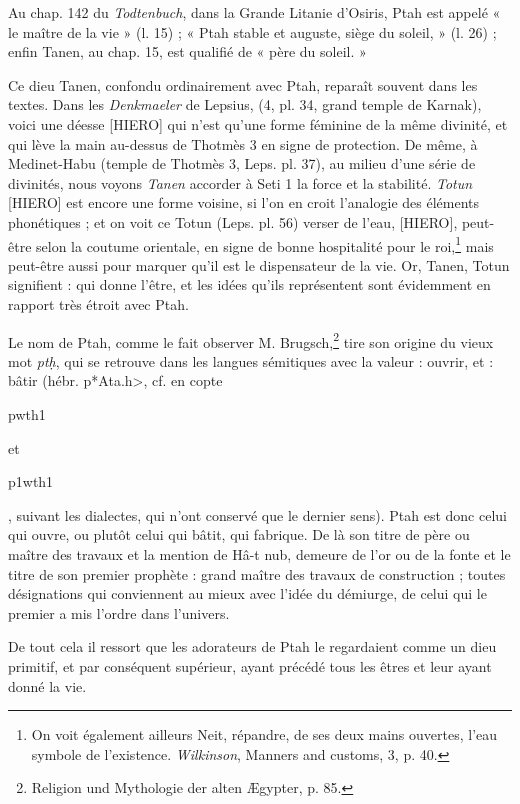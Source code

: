 \documentclass[a4paper, 11pt, oneside]{article}
\begin{document}
Au chap. 142 du \emph{Todtenbuch}, dans la Grande Litanie d'Osiris, Ptah est appelé « le maître de la vie » (l. 15) ; « Ptah stable et auguste, siège du soleil, » (l. 26) ; enfin Tanen, au chap. 15, est qualifié de « père du soleil. »

Ce dieu Tanen, confondu ordinairement avec Ptah, reparaît souvent dans les textes. Dans les \emph{Denkmaeler} de Lepsius, (4, pl. 34, grand temple de Karnak), voici une déesse [HIERO] qui n'est qu'une forme féminine de la même divinité, et qui lève la main au-dessus de Thotmès 3 en signe de protection. De même, à Medinet-Habu (temple de Thotmès 3, Leps. pl. 37), au milieu d'une série de divinités, nous voyons \emph{Tanen} accorder à Seti 1 la force et la stabilité. \emph{Totun} [HIERO] est encore une forme voisine, si l'on en croit l'analogie des éléments phonétiques ; et on voit ce Totun (Leps. pl. 56) verser de l'eau, [HIERO], peut-être selon la coutume orientale, en signe de bonne hospitalité pour le roi,\footnote{On voit également ailleurs Neit, répandre, de ses deux mains ouvertes, l'eau symbole de l'existence. \emph{Wilkinson}, Manners and customs, 3, p. 40.} mais peut-être aussi pour marquer qu'il est le dispensateur de la vie. Or, Tanen, Totun signifient : qui donne l'être, et les idées qu'ils représentent sont évidemment en rapport très étroit avec Ptah.

Le nom de Ptah, comme le fait observer M. Brugsch,\footnote{Religion und Mythologie der alten Ægypter, p. 85.} tire son origine du vieux mot \emph{ptḥ}, qui se retrouve dans les langues sémitiques avec la valeur : ouvrir, et : bâtir (hébr. \foreignlanguage{hebrew}{\<p*Ata.h>}, cf. en copte \begin{coptic}pwth1\end{coptic} et \begin{coptic}p1wth1\end{coptic}, suivant les dialectes, qui n'ont conservé que le dernier sens). Ptah est donc celui qui ouvre, ou plutôt celui qui bâtit, qui fabrique. De là son titre de père ou maître des travaux et la mention de Hâ-t nub, demeure de l'or ou de la fonte et le titre de son premier prophète : grand maître des travaux de construction ; toutes désignations qui conviennent au mieux avec l'idée du démiurge, de celui qui le premier a mis l'ordre dans l'univers.

De tout cela il ressort que les adorateurs de Ptah le regardaient comme un dieu primitif, et par conséquent supérieur, ayant précédé tous les êtres et leur ayant donné la vie.
\end{document}
